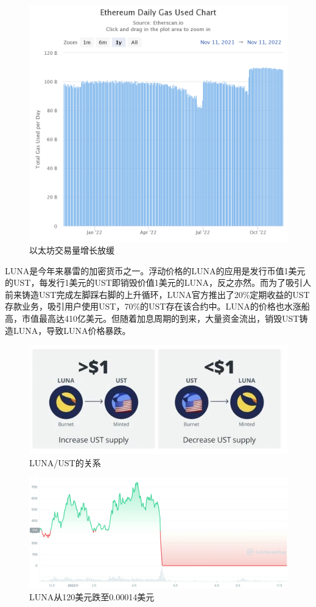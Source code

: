 \begin{figure}[H]
\begin{minipage}[t]{0.48\linewidth}
        \includegraphics[width=\linewidth]{img/ethereum-daily-gas-used.png}
        \caption{以太坊交易量增长放缓}
    \end{minipage}
\end{figure}

LUNA是今年来暴雷的加密货币之一。浮动价格的LUNA的应用是发行币值1美元的UST，每发行1美元的UST即销毁价值1美元的LUNA，反之亦然。而为了吸引人前来铸造UST完成左脚踩右脚的上升循环，LUNA官方推出了20\%定期收益的UST存款业务，吸引用户使用UST，70\%的UST存在该合约中。LUNA的价格也水涨船高，市值最高达410亿美元。但随着加息周期的到来，大量资金流出，销毁UST铸造LUNA，导致LUNA价格暴跌。
\begin{figure}[H]
    \includegraphics[width=\linewidth]{img/ust.jpeg}
    \caption{LUNA/UST的关系}
\end{figure}
\begin{figure}[H]
    \includegraphics[width=\linewidth]{img/luna.png}
    \caption{LUNA从120美元跌至0.00014美元}
\end{figure}

